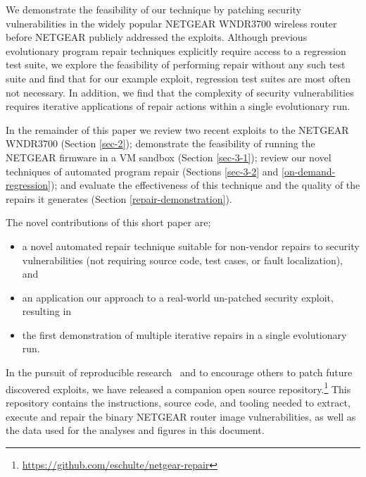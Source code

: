 \documentclass{sigcomm-alternate}
\begin{document}
We demonstrate the feasibility of our technique by patching security
vulnerabilities in the widely popular NETGEAR WNDR3700 wireless router
before NETGEAR publicly addressed the exploits.  Although previous
evolutionary program repair techniques explicitly require access to a
regression test suite, we explore the feasibility of performing repair
without any such test suite and find that for our example exploit,
regression test suites are most often not necessary. In addition, we find
that the complexity of security vulnerabilities requires iterative
applications of repair actions within a single evolutionary run. 

In the remainder of this paper we review two recent exploits to the
NETGEAR WNDR3700 (Section \ref{sec-2}); demonstrate the feasibility
of running the NETGEAR firmware in a VM sandbox (Section \ref{sec-3-1});
review our novel techniques of automated program repair (Sections
\ref{sec-3-2} and \ref{on-demand-regression}); and evaluate the effectiveness of this
technique and the quality of the repairs it generates (Section
\ref{repair-demonstration}).

The novel contributions of this short paper are;
\begin{itemize}
\item a novel automated repair technique suitable for non-vendor repairs to
security vulnerabilities (not requiring source code, test cases, or fault
localization), and 
\item an application our approach to a real-world un-patched
security exploit, resulting in
\item the first demonstration of multiple iterative repairs in a single
evolutionary run.
\end{itemize}

In the pursuit of reproducible
research~\cite{buckheit1995wavelab,mesirov2010accessible} and to encourage
others to patch
future discovered exploits, we have released a companion open source
repository.\footnote{\url{https://github.com/eschulte/netgear-repair}}
This repository contains the instructions, source
code, and tooling needed to extract, execute and repair the binary
NETGEAR router image vulnerabilities, as well as the data used for the
analyses and figures in this document.

\end{document}
